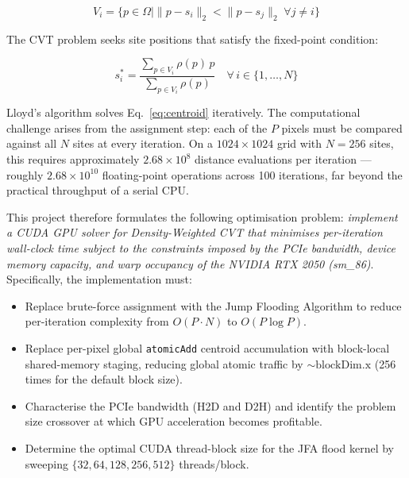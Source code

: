 \documentclass[12pt,a4paper]{article}
\begin{document}
\begin{equation}
    V_i = \{ p \in \Omega \mid \|p - s_i\|_2 < \|p - s_j\|_2 \; \forall j \neq i \}
\end{equation}

The CVT problem seeks site positions that satisfy the fixed-point condition:

\begin{equation}
    s_i^* = \frac{\displaystyle\sum_{p \in V_i} \rho(p)\, p}
                 {\displaystyle\sum_{p \in V_i} \rho(p)}
    \quad \forall\, i \in \{1,\dots,N\}
    \label{eq:centroid}
\end{equation}

Lloyd's algorithm solves Eq.~\eqref{eq:centroid} iteratively.  The
computational challenge arises from the assignment step: each of the $P$ pixels
must be compared against all $N$ sites at every iteration.  On a
$1024 \times 1024$ grid with $N = 256$ sites, this requires approximately
\mbox{$2.68 \times 10^8$} distance evaluations per iteration --- roughly
\mbox{$2.68 \times 10^{10}$} floating-point operations across 100 iterations,
far beyond the practical throughput of a serial CPU.

This project therefore formulates the following optimisation problem:
\textit{implement a CUDA GPU solver for Density-Weighted CVT that minimises
per-iteration wall-clock time subject to the constraints imposed by the PCIe
bandwidth, device memory capacity, and warp occupancy of the NVIDIA RTX 2050
(sm\_86)}.  Specifically, the implementation must:
\begin{itemize}
    \item Replace brute-force assignment with the Jump Flooding Algorithm to
          reduce per-iteration complexity from $O(P \cdot N)$ to $O(P \log P)$.
    \item Replace per-pixel global \texttt{atomicAdd} centroid accumulation with
          block-local shared-memory staging, reducing global atomic traffic by
          $\sim\!\text{blockDim.x}$ (256 times for the default block size).
    \item Characterise the PCIe bandwidth (H2D and D2H) and identify the problem
          size crossover at which GPU acceleration becomes profitable.
    \item Determine the optimal CUDA thread-block size for the JFA flood kernel
          by sweeping $\{32,64,128,256,512\}$ threads/block.
\end{itemize}

\end{document}
